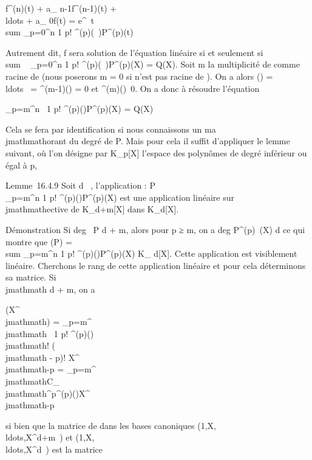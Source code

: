 \documentclass[]{article}
\begin{document}
f^(n)(t) + a_ n-1f^(n-1)(t) +
\\ldots + a_
0f(t) = e^\lambda~t \\sum
_p=0^n 1 \over p!
\chi^(p)(\lambda~)P^(p)(t)

Autrement dit, f sera solution de l'équation linéaire si et seulement
si~\\sum ~
_p=0^n 1 \over p!
\chi^(p)(\lambda~)P^(p)(X) = Q(X). Soit m la multiplicité de
\mu comme racine de \chi (nous poserons m = 0 si \mu n'est pas racine de \chi). On
a alors \chi(\mu) =
\\ldots~ =
\chi^(m-1)(\mu) = 0 et
\chi^(m)(\mu)\neq~0. On a donc à résoudre
l'équation

\sum _p=m^n~ 1
\over p! \chi^(p)(\mu)P^(p)(X) = Q(X)

Cela se fera par identification si nous connaissons un ma\\jmathmathorant du degré
de P. Mais pour cela il suffit d'appliquer le lemme suivant, où l'on
désigne par K_p{[}X{]} l'espace des polynômes de degré
inférieur ou égal à p,

Lemme~16.4.9 Soit d \in {}~, l'application \theta :
P\mapsto~\\\sum
 _p=m^n 1 \over p!
\chi^(p)(\mu)P^(p)(X) est une application linéaire
sur\\jmathmathective de K_d+m{[}X{]} dans K_d{[}X{]}.

Démonstration Si deg~ P \leq d + m, alors pour p ≥
m, on a deg P^(p)~(X) \leq d ce qui
montre que \theta(P) =\ \\sum
 _p=m^n 1 \over p!
\chi^(p)(\mu)P^(p)(X) \in K_ d{[}X{]}. Cette
application est visiblement linéaire. Cherchons le rang de cette
application linéaire et pour cela déterminons sa matrice. Si \\jmathmath \leq d + m,
on a

\theta(X^\\jmathmath) = \sum _p=m^\\jmathmath~
1 \over p! \chi^(p)(\mu) \\jmathmath!
\over (\\jmathmath - p)! X^\\jmathmath-p =
\sum _p=m^\\jmathmathC_
\\jmathmath^p\chi^(p)(\mu)X^\\jmathmath-p

si bien que la matrice de \theta dans les bases canoniques
(1,X,\\ldots,X^d+m~)
et
(1,X,\\ldots,X^d~)
est la matrice
\end{document}
